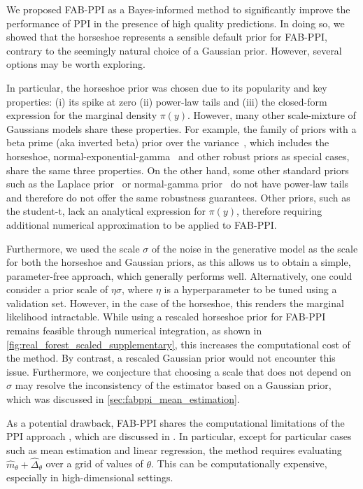 We proposed FAB-PPI as a Bayes-informed method to significantly improve the performance of PPI in the presence of high quality predictions. In doing so, we showed that the horseshoe represents a sensible default prior for FAB-PPI, contrary to the seemingly natural choice of a Gaussian prior. However, several options may be worth exploring.

In particular, the horseshoe prior was chosen due to its popularity and key properties: (i) its spike at zero (ii) power-law tails and  (iii) the closed-form expression for the marginal density $\pi(y)$. However, many other scale-mixture of Gaussians models share these properties.
For example, the family of priors with a beta prime (aka inverted beta) prior over the variance~\citep{Polson2012}, which includes the horseshoe, normal-exponential-gamma~\citep{Griffin2011} and other robust priors \citep{Berger1980,Strawderman1971} as special cases, share the same three properties.
On the other hand, some other standard priors such as the Laplace prior~\citep{Park2008} or normal-gamma prior~\citep{Caron2008,Griffin2010} do not have power-law tails and therefore do not offer the same robustness guarantees. Other priors, such as the student-t, lack an analytical expression for $\pi(y)$, therefore requiring additional numerical approximation to be applied to FAB-PPI.

Furthermore, we used the scale $\sigma$ of the noise in the generative model as the scale for both the horseshoe and Gaussian priors, as this allows us to obtain a simple, parameter-free approach, which generally performs well.
Alternatively, one could consider a prior scale of $\eta\sigma$, where $\eta$ is a hyperparameter to be tuned using a validation set.
However, in the case of the horseshoe, this renders the marginal likelihood intractable. While using a rescaled horseshoe prior for FAB-PPI remains feasible through numerical integration, as shown in \cref{fig:real_forest_scaled_supplementary}, this increases the computational cost of the method.
By contrast, a rescaled Gaussian prior would not encounter this issue.
Furthermore, we conjecture that choosing a scale that does not depend on $\sigma$ may resolve the inconsistency of the estimator based on a Gaussian prior, which was discussed in \cref{sec:fabppi_mean_estimation}. 

As a potential drawback, FAB-PPI shares the computational limitations of the PPI approach \citep{Angelopoulos2023}, which are discussed in \citet{Angelopoulos2023a}. In particular, except for particular cases such as mean estimation and linear regression, the method requires evaluating $\widehat m_\theta + \widehat\Delta_\theta$ over a grid of values of $\theta$. This can be computationally expensive, especially in high-dimensional settings.
